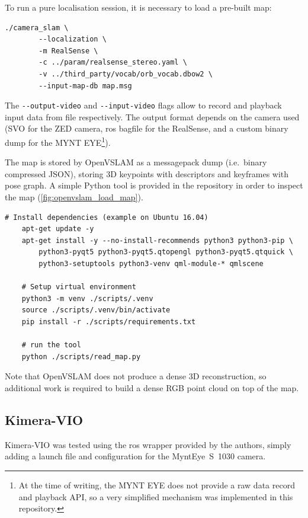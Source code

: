 \documentclass[11pt, letterpaper, twoside]{article}
\begin{document}
To run a pure localisation session, it is necessary to load a pre-built map:

\begin{Verbatim}[samepage=true]
    ./camera_slam \
        --localization \
        -m RealSense \
        -c ../param/realsense_stereo.yaml \
        -v ../third_party/vocab/orb_vocab.dbow2 \
        --input-map-db map.msg
\end{Verbatim}

The \texttt{-{}-output-video} and \texttt{-{}-input-video} flags allow to
record and playback input data from file respectively. The output format
depends on the camera used (SVO for the ZED camera, \gls{ros} bagfile for the
RealSense, and a custom binary dump for the MYNT EYE\footnote{At the time of
writing, the MYNT EYE does not provide a raw data record and playback API,
so a very simplified mechanism was implemented in this repository.}).

The map is stored by OpenVSLAM as a messagepack dump (i.e.\ binary compressed
JSON), storing 3D keypoints with descriptors and keyframes with pose graph. A
simple Python tool is provided in the repository in order to inspect the map
(\cref{fig:openvslam_load_map}).

\begin{Verbatim}[samepage=true]
    # Install dependencies (example on Ubuntu 16.04)
    apt-get update -y
    apt-get install -y --no-install-recommends python3 python3-pip \
        python3-pyqt5 python3-pyqt5.qtopengl python3-pyqt5.qtquick \
        python3-setuptools python3-venv qml-module-* qmlscene

    # Setup virtual environment
    python3 -m venv ./scripts/.venv
    source ./scripts/.venv/bin/activate
    pip install -r ./scripts/requirements.txt

    # run the tool
    python ./scripts/read_map.py
\end{Verbatim}

Note that OpenVSLAM does not produce a dense 3D reconstruction, so additional
work is required to build a dense RGB point cloud on top of the map.

\subsection{Kimera-VIO}\label{sec:kimera-setup}

Kimera-VIO was tested using the \gls{ros} wrapper provided by the authors, simply
adding a launch file and configuration for the MyntEye~S~1030 camera.
\end{document}
